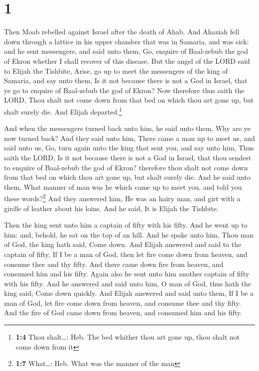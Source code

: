 \hypertarget{section}{%
\section{1}\label{section}}

 Then Moab rebelled against Israel after the death of
Ahab.  And Ahaziah fell down through a lattice in his
upper chamber that was in Samaria, and was sick: and he sent messengers,
and said unto them, Go, enquire of Baal-zebub the god of Ekron whether I
shall recover of this disease.  But the angel of the LORD
said to Elijah the Tishbite, Arise, go up to meet the messengers of the
king of Samaria, and say unto them, Is it not because there is not a God
in Israel, that ye go to enquire of Baal-zebub the god of Ekron?
 Now therefore thus saith the LORD, Thou shalt not come
down from that bed on which thou art gone up, but shalt surely die. And
Elijah departed.\footnote{\textbf{1:4} Thou shalt\ldots: Heb. The bed
  whither thou art gone up, thou shalt not come down from it}

 And when the messengers turned back unto him, he said
unto them, Why are ye now turned back?  And they said unto
him, There came a man up to meet us, and said unto us, Go, turn again
unto the king that sent you, and say unto him, Thus saith the LORD, Is
it not because there is not a God in Israel, that thou sendest to
enquire of Baal-zebub the god of Ekron? therefore thou shalt not come
down from that bed on which thou art gone up, but shalt surely die.
 And he said unto them, What manner of man was he which
came up to meet you, and told you these words?\footnote{\textbf{1:7}
  What\ldots: Heb. What was the manner of the man}  And
they answered him, He was an hairy man, and girt with a girdle of
leather about his loins. And he said, It is Elijah the Tishbite.

 Then the king sent unto him a captain of fifty with his
fifty. And he went up to him: and, behold, he sat on the top of an hill.
And he spake unto him, Thou man of God, the king hath said, Come down.
 And Elijah answered and said to the captain of fifty, If
I be a man of God, then let fire come down from heaven, and consume thee
and thy fifty. And there came down fire from heaven, and consumed him
and his fifty.  Again also he sent unto him another
captain of fifty with his fifty. And he answered and said unto him, O
man of God, thus hath the king said, Come down quickly. 
And Elijah answered and said unto them, If I be a man of God, let fire
come down from heaven, and consume thee and thy fifty. And the fire of
God came down from heaven, and consumed him and his fifty.

